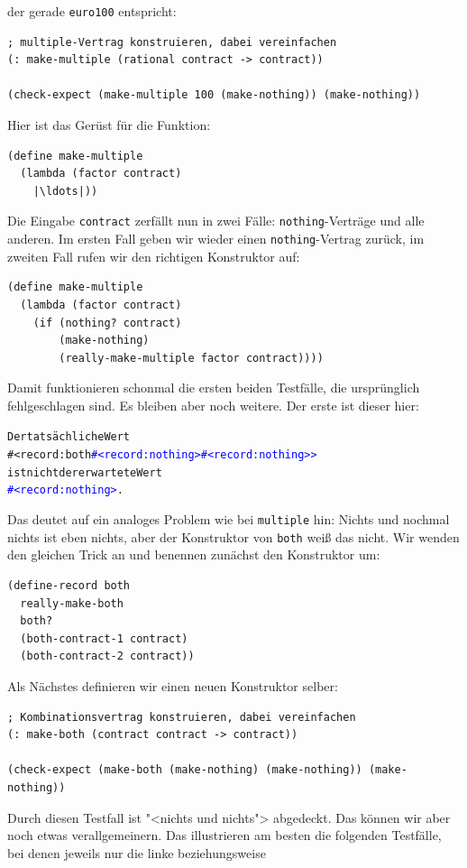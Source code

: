 der gerade \lstinline{euro100} entspricht:
%
\begin{lstlisting}
; multiple-Vertrag konstruieren, dabei vereinfachen
(: make-multiple (rational contract -> contract))

(check-expect (make-multiple 100 (make-nothing)) (make-nothing))
\end{lstlisting}
%
Hier ist das Gerüst für die Funktion:
%
\begin{lstlisting}
(define make-multiple
  (lambda (factor contract)
    |\ldots|))
\end{lstlisting}
%
Die Eingabe \lstinline{contract} zerfällt nun in zwei Fälle:
\lstinline{nothing}-Verträge und alle anderen.  Im ersten Fall geben
wir wieder einen \lstinline{nothing}-Vertrag zurück, im zweiten Fall
rufen wir den richtigen Konstruktor auf:
%
\begin{lstlisting}
(define make-multiple
  (lambda (factor contract)
    (if (nothing? contract)
        (make-nothing)
        (really-make-multiple factor contract))))
\end{lstlisting}
%
Damit funktionieren schonmal die ersten beiden Testfälle, die
ursprünglich fehlgeschlagen sind.  Es bleiben aber noch weitere.  Der erste
ist dieser hier:
%
\begin{alltt}
Der tatsächliche Wert
#<record:both \textcolor{blue}{#<record:nothing> #<record:nothing>>}
ist nicht der erwartete Wert
\textcolor{blue}{#<record:nothing>}.
\end{alltt}
%
Das deutet auf ein analoges Problem wie bei \lstinline{multiple} hin:
Nichts und nochmal nichts ist eben nichts, aber der Konstruktor von
\lstinline{both} weiß das nicht.  Wir wenden den gleichen Trick an und
benennen zunächst den Konstruktor um:
%
\begin{lstlisting}
(define-record both
  really-make-both
  both?
  (both-contract-1 contract)
  (both-contract-2 contract))  
\end{lstlisting}
%
Als Nächstes definieren wir einen neuen Konstruktor selber:
%
\begin{lstlisting}
; Kombinationsvertrag konstruieren, dabei vereinfachen
(: make-both (contract contract -> contract))

(check-expect (make-both (make-nothing) (make-nothing)) (make-nothing))
\end{lstlisting}
%
Durch diesen Testfall ist "<nichts und nichts"> abgedeckt.  Das können
wir aber noch etwas verallgemeinern.  Das illustrieren am besten die
folgenden Testfälle, bei denen jeweils nur die linke beziehungsweise
